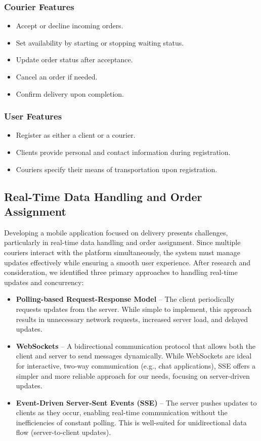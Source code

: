\documentclass[a4paper,twoside,11pt]{article}
\begin{document}
\subsubsection{Courier Features}  
\begin{itemize}
    \item Accept or decline incoming orders.
    \item Set availability by starting or stopping waiting status.
    \item Update order status after acceptance.
    \item Cancel an order if needed.
    \item Confirm delivery upon completion.
\end{itemize}

\subsubsection{User Features}  
\begin{itemize}
    \item Register as either a client or a courier.
    \item Clients provide personal and contact information during registration.
    \item Couriers specify their means of transportation upon registration.
\end{itemize}
  

\subsection{Real-Time Data Handling and Order Assignment}  

Developing a mobile application focused on delivery presents challenges, particularly in real-time data handling and order assignment. Since multiple couriers interact with the platform simultaneously, the system must manage updates effectively while ensuring a smooth user experience. After research and consideration, we identified three primary approaches to handling real-time updates and concurrency:

\begin{itemize}
    \item \textbf{Polling-based Request-Response Model} – The client periodically requests updates from the server. While simple to implement, this approach results in unnecessary network requests, increased server load, and delayed updates.
    \item \textbf{WebSockets} – A bidirectional communication protocol that allows both the client and server to send messages dynamically. While WebSockets are ideal for interactive, two-way communication (e.g., chat applications), SSE offers a simpler and more reliable approach for our needs, focusing on server-driven updates.
    \item \textbf{Event-Driven Server-Sent Events (SSE)} – The server pushes updates to clients as they occur, enabling real-time communication without the inefficiencies of constant polling. This is well-suited for unidirectional data flow (server-to-client updates).
\end{itemize}
\end{document}
